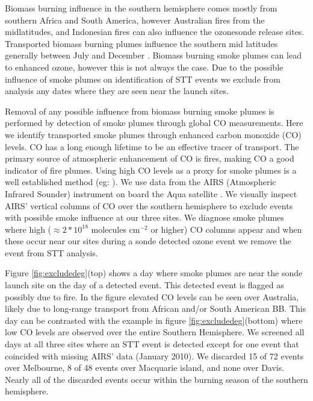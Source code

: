 \documentclass{article}
\begin{document}
    Biomass burning influence in the southern hemisphere comes mostly from southern Africa and South America, however Australian fires from the midlatitudes, and Indonesian fires can also influence the ozonesonde release sites.
    Transported biomass burning plumes influence the southern mid latitudes generally between July and December \citep{Pak2003}.
    Biomass burning smoke plumes can lead to enhanced ozone, however this is not always the case.
    Due to the possible influence of smoke plumes on identification of STT events we exclude from analysis any dates where they are seen near the launch sites.
    
    Removal of any possible influence from biomass burning smoke plumes is performed by detection of smoke plumes through global CO measurements.
    Here we identify transported smoke plumes through enhanced carbon monoxide (CO) levels.
    CO has a long enough lifetime to be an effective tracer of transport.
    The primary source of atmospheric enhancement of CO is fires, making CO a good indicator of fire plumes.
    Using high CO levels as a proxy for smoke plumes is a well established method (eg: \citet{Edwards2003,Sinha2004,Edwards2006,Mari2008}).
    We use data from the AIRS (Atmospheric Infrared Sounder) instrument on board the Aqua satellite \citep{AIRS3STD}.
    We visually inspect AIRS' vertical columns of CO over the southern hemisphere to exclude events with possible smoke influence at our three sites.
    We diagnose smoke plumes where high ($\approx 2*10^{18}$ molecules cm$^{-2}$ or higher) CO columns appear and when these occur near our sites during a sonde detected ozone event we remove the event from STT analysis.

    Figure \ref{fig:excludedeg}(top) shows a day where smoke plumes are near the sonde launch site on the day of a detected event. 
    This detected event is flagged as possibly due to fire.
    In the figure elevated CO levels can be seen over Australia, likely due to long-range transport from African and/or South American BB.
    This day can be contrasted with the example in figure \ref{fig:excludedeg}(bottom) where low CO levels are observed over the entire Southern Hemisphere.
    We screened all days at all three sites where an STT event is detected except for one event that coincided with missing AIRS' data (January 2010). 
    We discarded 15 of 72 events over Melbourne, 8 of 48 events over Macquarie island, and none over Davis.
    Nearly all of the discarded events occur within the burning season of the southern hemisphere.
    
\end{document}
